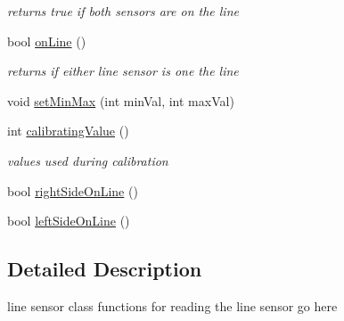 \begin{DoxyCompactItemize}
\begin{DoxyCompactList}\small\item\em returns true if both sensors are on the line \end{DoxyCompactList}\item 
\hypertarget{classLineSensor_ad9d3c5a694f1ff946d1137df1694b026}{bool \hyperlink{classLineSensor_ad9d3c5a694f1ff946d1137df1694b026}{on\-Line} ()}\label{classLineSensor_ad9d3c5a694f1ff946d1137df1694b026}

\begin{DoxyCompactList}\small\item\em returns if either line sensor is one the line \end{DoxyCompactList}\item 
void \hyperlink{classLineSensor_a1c76fb6ddfea2243b6bb3a61015f8b59}{set\-Min\-Max} (int min\-Val, int max\-Val)
\item 
\hypertarget{classLineSensor_a51eeba9a7b0f56a69a0157f6f576495f}{int \hyperlink{classLineSensor_a51eeba9a7b0f56a69a0157f6f576495f}{calibrating\-Value} ()}\label{classLineSensor_a51eeba9a7b0f56a69a0157f6f576495f}

\begin{DoxyCompactList}\small\item\em values used during calibration \end{DoxyCompactList}\item 
bool \hyperlink{classLineSensor_a92c8d91032dcba0860007e6d7248329f}{right\-Side\-On\-Line} ()
\item 
bool \hyperlink{classLineSensor_a59fdc7f06ce311ccef3ed99f005830fa}{left\-Side\-On\-Line} ()
\end{DoxyCompactItemize}


\subsection{Detailed Description}
line sensor class functions for reading the line sensor go here 

